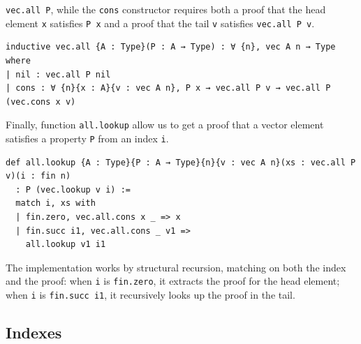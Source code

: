 \documentclass[preprint,12pt]{elsarticle}
\theoremstyle{definition}
\begin{document}
\lstinline|vec.all P|, while the \lstinline|cons| constructor requires both
a proof that the head element \lstinline|x| satisfies \lstinline|P x| and a
proof that the tail \lstinline|v| satisfies \lstinline|vec.all P v|.
\begin{lstlisting}
inductive vec.all {A : Type}(P : A → Type) : ∀ {n}, vec A n → Type where
| nil : vec.all P nil
| cons : ∀ {n}{x : A}{v : vec A n}, P x → vec.all P v → vec.all P (vec.cons x v)
\end{lstlisting}
Finally, function \lstinline|all.lookup| allow us to get a proof that a
vector element satisfies a property \lstinline|P| from an index \lstinline|i|.
\begin{lstlisting}
def all.lookup {A : Type}{P : A → Type}{n}{v : vec A n}(xs : vec.all P v)(i : fin n)
  : P (vec.lookup v i) :=
  match i, xs with
  | fin.zero, vec.all.cons x _ => x
  | fin.succ i1, vec.all.cons _ v1 =>
    all.lookup v1 i1
\end{lstlisting}
The implementation works by structural recursion, matching on both the index
and the proof: when \lstinline|i| is \lstinline|fin.zero|, it extracts the
proof for the head element; when \lstinline|i| is \lstinline|fin.succ i1|, it
recursively looks up the proof in the tail.

\subsection{Indexes}\label{sec:index-lean}
\end{document}
